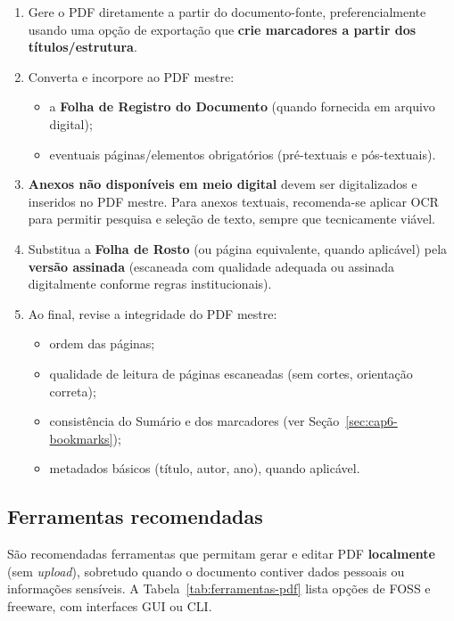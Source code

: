\begin{enumerate}
    \item Gere o PDF diretamente a partir do documento-fonte, preferencialmente usando uma opção de exportação que \textbf{crie marcadores a partir dos títulos/estrutura}.

    \item Converta e incorpore ao PDF mestre:
    \begin{itemize}
        \item a \textbf{Folha de Registro do Documento} (quando fornecida em arquivo digital);
        \item eventuais páginas/elementos obrigatórios (pré-textuais e pós-textuais).
    \end{itemize}

    \item \textbf{Anexos não disponíveis em meio digital} devem ser digitalizados e inseridos no PDF mestre. Para anexos textuais, recomenda-se aplicar \ac{OCR} para permitir pesquisa e seleção de texto, sempre que tecnicamente viável.

    \item Substitua a \textbf{Folha de Rosto} (ou página equivalente, quando aplicável) pela \textbf{versão assinada} (escaneada com qualidade adequada ou assinada digitalmente conforme regras institucionais).

    \item Ao final, revise a integridade do PDF mestre:
    \begin{itemize}
        \item ordem das páginas;
        \item qualidade de leitura de páginas escaneadas (sem cortes, orientação correta);
        \item consistência do Sumário e dos marcadores (ver Seção~\ref{sec:cap6-bookmarks});
        \item metadados básicos (título, autor, ano), quando aplicável.
    \end{itemize}
\end{enumerate}

\subsection{Ferramentas recomendadas}

São recomendadas ferramentas que permitam gerar e editar PDF \textbf{localmente} (sem \textit{upload}), sobretudo quando o documento contiver dados pessoais ou informações sensíveis. A Tabela~\ref{tab:ferramentas-pdf} lista opções de \ac{FOSS} e freeware, com interfaces \ac{GUI} ou \ac{CLI}.

